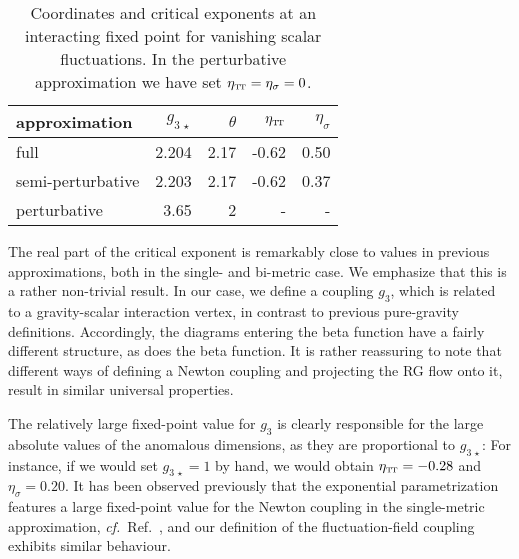 \documentclass[11pt]{book}
\newcommand\TTspace{ -1pt }
\newcommand\etaTT{ \eta_{\scriptscriptstyle{\mathrm{T\hspace{\TTspace}T}}} }
\newcommand\cf{\textit{cf.}\ }
\numberwithin{equation}{chapter}
\begin{document}
\begin{table}[]
  \begin{center}
    \begin{tabular}{ l r r r r }
      \toprule
      approximation      & $g_{3\,\star}$ & $\theta$ & $\etaTT$ & $\eta_{\sigma}$ \\
      \midrule
      full               & 2.204         & 2.17     & -0.62           & 0.50 \\
      semi-perturbative  & 2.203         & 2.17     & -0.62           & 0.37 \\
      perturbative       & 3.65          & 2        & -               & -    \\
      \bottomrule
    \end{tabular}
  \end{center}
  \caption[Coordinates and critical exponents of fixed points in perturbative approximation]
  {
    Coordinates and critical exponents at an interacting fixed point for vanishing scalar fluctuations.
    In the perturbative approximation we have set $\etaTT = \eta_{\sigma} = 0$.
  }
  \label{puregravityFP_table}
\end{table}

The real part of the critical exponent is remarkably close to values in previous approximations,
both in the single- and bi-metric case. We emphasize that this is a  rather non-trivial result.
In our case, we define a coupling $g_3$, which is related to a gravity-scalar interaction vertex,
in contrast to previous pure-gravity definitions.
Accordingly, the diagrams entering the beta function have a fairly different structure,
as does the beta function.
It is rather reassuring to note that different ways of defining a Newton coupling and projecting
the RG flow onto it, result in similar universal properties.

The relatively large fixed-point value for $g_3$ is clearly responsible for the large absolute
values of the anomalous dimensions, as they are proportional to $g_{3\,\star}$: For instance,
if we would set $g_{3\,\star}=1$ by hand, we would obtain $\etaTT = -0.28$ and $\eta_{\sigma} =0.20$.
It has been observed previously that the exponential parametrization features a large fixed-point
value for the Newton coupling in the single-metric approximation, \cf Ref.~\cite{Percacci:2015wwa},
and our definition of the fluctuation-field coupling exhibits similar behaviour.
\end{document}
